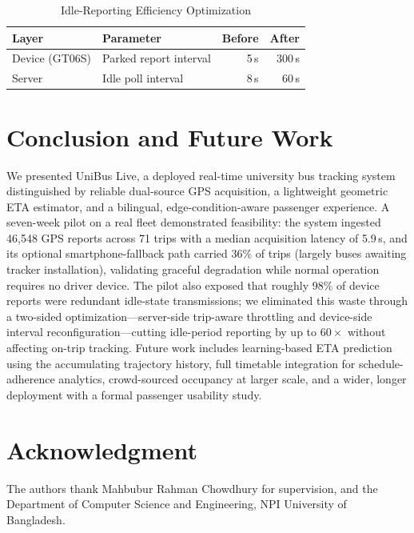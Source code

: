 \documentclass[conference]{IEEEtran}
\begin{document}
\begin{table}[H]
\caption{Idle-Reporting Efficiency Optimization}
\label{tab:efficiency}
\centering
\begin{tabular}{llrr}
\toprule
\textbf{Layer} & \textbf{Parameter} & \textbf{Before} & \textbf{After} \\
\midrule
Device (GT06S) & Parked report interval & 5\,s & 300\,s \\
Server         & Idle poll interval     & 8\,s & 60\,s \\
\bottomrule
\end{tabular}
\end{table}

\section{Conclusion and Future Work}
\label{sec:conclusion}
We presented UniBus Live, a deployed real-time university bus tracking system
distinguished by reliable dual-source GPS acquisition, a lightweight
geometric ETA estimator, and a bilingual, edge-condition-aware passenger
experience. A seven-week pilot on a real fleet demonstrated feasibility: the
system ingested 46{,}548 GPS reports across 71 trips with a median acquisition
latency of 5.9\,s, and its optional smartphone-fallback path carried 36\% of trips (largely
buses awaiting tracker installation), validating graceful degradation while
normal operation requires no driver device. The pilot also exposed that roughly 98\% of
device reports were redundant idle-state transmissions; we eliminated this
waste through a two-sided optimization---server-side trip-aware throttling and
device-side interval reconfiguration---cutting idle-period reporting by up to
$60\times$ without affecting on-trip tracking. Future work includes
learning-based ETA prediction using the accumulating trajectory history, full
timetable integration for schedule-adherence analytics, crowd-sourced
occupancy at larger scale, and a wider, longer deployment with a formal
passenger usability study.

\section*{Acknowledgment}
The authors thank Mahbubur Rahman Chowdhury for supervision, and the
Department of Computer Science and Engineering, NPI University of Bangladesh.
\end{document}
